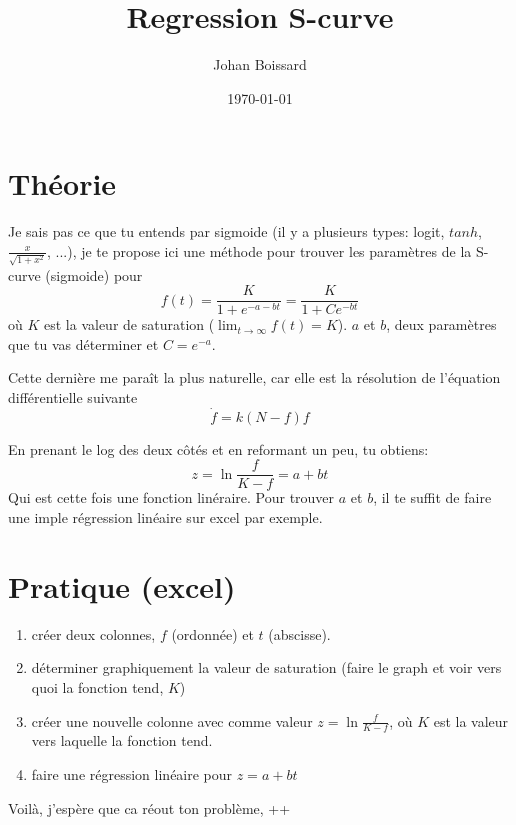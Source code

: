 \documentclass[a4paper,titlepage] {scrartcl}
\author{Johan Boissard}
\date{\today}
\title{Regression S-curve}
\begin{document}

\section{Théorie}
Je sais pas ce que tu entends par sigmoide (il y a plusieurs types: logit, $tanh$, $\frac{x}{\sqrt{1+x^2}}$, ...), je te propose ici une méthode pour trouver les paramètres de la S-curve (sigmoide) pour 
\begin{equation}
	f(t)= \frac{K}{1+e^{-a-bt}}=\frac{K}{1+Ce^{-bt}}
\end{equation}
où $K$ est la valeur de saturation ($\lim_{t\rightarrow\infty}f(t)=K$). $a$ et $b$, deux paramètres que tu vas déterminer et $C=e^{-a}$.

Cette dernière me paraît la plus naturelle, car elle est la résolution de l'équation différentielle suivante
\begin{equation}
	\dot f = k(N-f)f
\end{equation}

En prenant le log des deux côtés et en reformant un peu, tu obtiens:
\begin{equation}
	z=\ln{\frac{f}{K-f}}=a+bt
\end{equation}
Qui est cette fois une fonction linéraire. Pour trouver $a$ et $b$, il te suffit de faire une imple régression linéaire sur excel par exemple.

\section{Pratique (excel)}
\begin{enumerate}
	\item créer deux colonnes, $f$ (ordonnée) et $t$ (abscisse).
	\item déterminer graphiquement la valeur de saturation (faire le graph et voir vers quoi la fonction tend, $K$)
	\item créer une nouvelle colonne avec comme valeur $z=\ln{\frac{f}{K-f}}$, où $K$ est la valeur vers laquelle la fonction tend.
	\item faire une régression linéaire pour $z=a+bt$
\end{enumerate}


Voilà, j'espère que ca réout ton problème, ++
\end{document}
